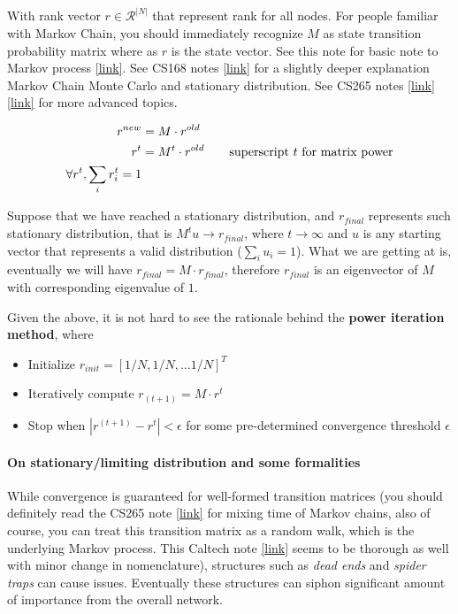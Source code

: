 With rank vector $r \in \mathcal{R}^{|N|}$ that represent rank for all nodes. For people familiar with Markov Chain, you should immediately recognize $M$ as state transition probability matrix where as $r$ is the state vector. See this note for basic note to Markov process \href{https://towardsdatascience.com/brief-introduction-to-markov-chains-2c8cab9c98ab}{[link]}. See CS168 notes \href{https://web.stanford.edu/class/cs168/l/l14.pdf}{[link]} for a slightly deeper explanation Markov Chain Monte Carlo and stationary distribution. See CS265 notes \href{https://theory.stanford.edu/~valiant/teaching/CS265/lectureNotes/l14.pdf}{[link]} \href{https://theory.stanford.edu/~valiant/teaching/CS265/lectureNotes/l15.pdf}{[link]} for more advanced topics. 

\begin{align}
    r^{new} &= M\cdot r^{old} \\
    r^{t} &= M^t \cdot r^{old} \text{\qquad superscript $t$ for matrix power} \\
    \forall r^{t}, \sum_{i}r_{i}^{t} = 1
\end{align}{}

Suppose that we have reached a stationary distribution, and $r_{final}$ represents such stationary distribution, that is $M^{t}u \rightarrow r_{final}$, where $t \rightarrow \infty$ and $u$ is any starting vector that represents a valid distribution ($\sum_{i} u_i = 1$). What we are getting at is, eventually we will have $r_{final} = M \cdot r_{final}$, therefore $r_{final}$ is an eigenvector of $M$ with corresponding eigenvalue of $1$.

Given the above, it is not hard to see the rationale behind the \textbf{power iteration method}, where

\begin{itemize}
    \item Initialize $r_{init}= [1/N, 1/N, \dots 1/N]^T$
    
    \item Iteratively compute $r_{(t+1)} = M\cdot r^t$
    
    \item Stop when $|r^{(t+1)} - r^t| < \epsilon$ for some pre-determined convergence threshold $\epsilon$
\end{itemize}{}

\paragraph{On stationary/limiting distribution and some formalities} While convergence is guaranteed for well-formed transition matrices (you should definitely read the CS265 note \href{https://theory.stanford.edu/~valiant/teaching/CS265/lectureNotes/l15.pdf}{[link]} for mixing time of Markov chains, also of course, you can treat this transition matrix as a random walk, which is the underlying Markov process. This Caltech note \href{http://www.math.caltech.edu/~2016-17/2term/ma003/Notes/Lecture15.pdf}{[link]} seems to be thorough as well with minor change in nomenclature), structures such as \textit{dead ends} and \textit{spider traps} can cause issues. Eventually these structures can siphon significant amount of importance from the overall network.

